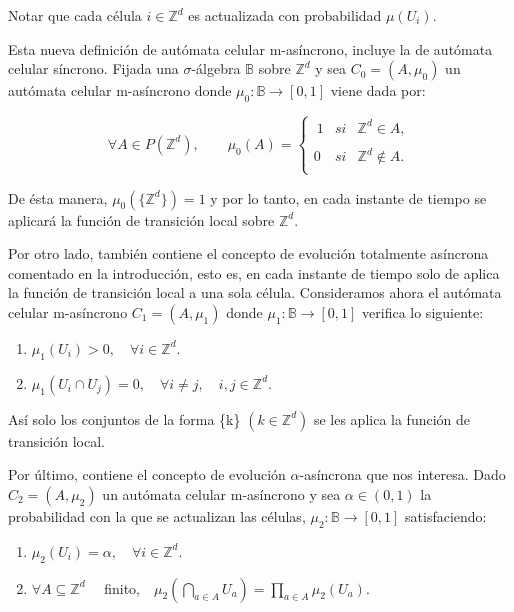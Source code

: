 \documentclass[../proyecto.tex]{memoir}
\begin{document}
Notar que cada célula $i \in \mathds{Z}^{d}$ es actualizada con probabilidad $\mu(U_{i})$.

Esta nueva definición de autómata celular m-asíncrono, incluye la de autómata celular síncrono. Fijada una $\sigma$-álgebra $\mathds{B}$ sobre $\mathds{Z}^{d}$ y sea $C_{0}=(A, \mu_{0})$ un autómata celular m-asíncrono donde $\mu_{0}: \mathds{B} \rightarrow [0,1]$ viene dada por: 

\begin{equation*}
	 \forall A \in P(\mathds{Z}^{d}), \qquad 
	 \mu_{0}(A) = \left\{ \begin{array}{lcc}
             \ 1 &   si  & \mathds{Z}^{d} \in A ,\\
             \\0 &   si  & \mathds{Z}^{d} \notin A .\\
             \end{array}
             \right.
\end{equation*}

De ésta manera, $\mu_{0}(\{\mathds{Z}^{d}\})=1$ y por lo tanto, en cada instante de tiempo se aplicará la función de transición local sobre $\mathds{Z}^{d}$.

Por otro lado, también contiene el concepto de evolución totalmente asíncrona comentado en la introducción, esto es, en cada instante de tiempo solo de aplica la función de transición local a una sola célula. Consideramos ahora el autómata celular m-asíncrono $C_{1}=(A, \mu_{1})$ donde $\mu_{1}: \mathds{B} \rightarrow [0,1]$ verifica lo siguiente:

\begin{enumerate}
\item $\mu_{1}(U_{i}) > 0, \quad \forall i \in \mathds{Z}^{d}$.
\item $\mu_{1}(U_{i} \cap U_{j}) = 0, \quad \forall i \neq j, \quad i,j \in \mathds{Z}^{d}$.
\end{enumerate}

Así solo los conjuntos de la forma \{k\} $(k \in \mathds{Z}^{d})$ se les aplica la función de transición local.

Por último, contiene el concepto de evolución $\alpha$-asíncrona que nos interesa. Dado $C_{2}=(A, \mu_{2})$ un autómata celular m-asíncrono y sea $\alpha \in (0,1)$ la probabilidad con la que se actualizan las células, $\mu_{2}: \mathds{B} \rightarrow [0,1]$ satisfaciendo:

\begin{enumerate}
\item $\mu_{2}(U_{i}) = \alpha, \quad \forall i \in \mathds{Z}^{d}$.
\item $ \forall A \subseteq \mathds{Z}^{d} \quad$ finito,$\quad  \mu_{2} ( \bigcap_{a \in A} U_{a} ) = \prod_{a \in A} \mu_{2} ( U_{a} )$.
\end{enumerate}
\end{document}
